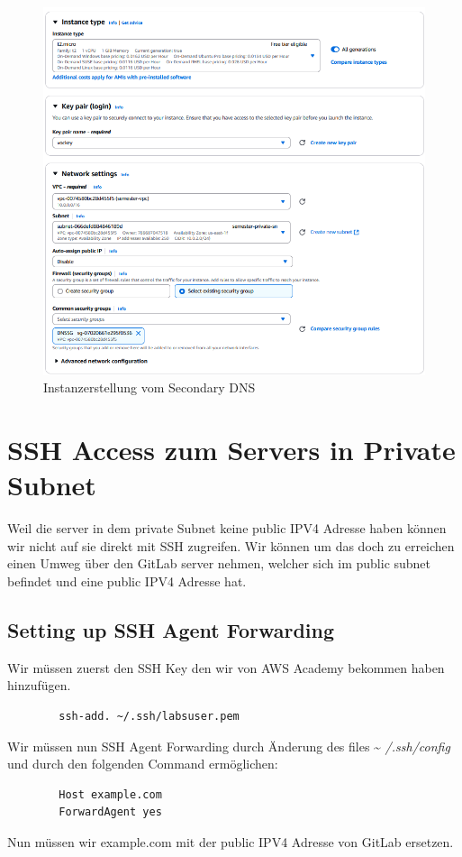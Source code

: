 \documentclass[a4paper,12pt]{article}
\begin{document}
\begin{figure}[H]
	\centering
	\includegraphics[width=\textwidth]{data/Launch_Instance_DNS_Secondary2.png}
	\caption{Instanzerstellung vom Secondary DNS}
	\label{fig:Instanzecreation vom Secondary DNS2}
\end{figure}

\section{SSH Access zum Servers in Private Subnet}
Weil die server in dem private Subnet keine public IPV4 Adresse haben können wir nicht auf sie direkt mit SSH zugreifen. 
Wir können um das doch zu erreichen einen Umweg über den GitLab server nehmen, welcher sich im public subnet befindet und eine public IPV4 Adresse hat.

\subsection{Setting up SSH Agent Forwarding}
Wir müssen zuerst den SSH Key den wir von AWS Academy bekommen haben hinzufügen.
\begin{verbatim}
		ssh-add. ~/.ssh/labsuser.pem
\end{verbatim}

Wir müssen nun SSH Agent Forwarding durch Änderung des files \~{} \textit{/.ssh/config} und durch den folgenden Command ermöglichen:
\begin{verbatim}
		Host example.com 
		ForwardAgent yes
\end{verbatim}
Nun müssen wir example.com mit der public IPV4 Adresse von GitLab ersetzen.
\end{document}
